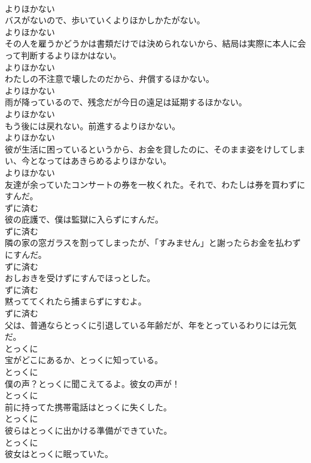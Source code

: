 \documentclass[8pt]{extreport}
\begin{document}
\begin{CJK}{UTF8}{min}
\\	よりほかない	
\\	バスがないので、歩いていくよりほかしかたがない。	
\\	よりほかない	
\\	その人を雇うかどうかは書類だけでは決められないから、結局は実際に本人に会って判断するよりほかはない。	
\\	よりほかない	
\\	わたしの不注意で壊したのだから、弁償するほかない。	
\\	よりほかない	
\\	雨が降っているので、残念だが今日の遠足は延期するほかない。	
\\	よりほかない	
\\	もう後には戻れない。前進するよりほかない。	
\\	よりほかない	
\\	彼が生活に困っているというから、お金を貸したのに、そのまま姿をけしてしまい、今となってはあきらめるよりほかない。	
\\	よりほかない	
\\	友達が余っていたコンサートの券を一枚くれた。それで、わたしは券を買わずにすんだ。	
\\	ずに済む	
\\	彼の庇護で、僕は監獄に入らずにすんだ。	
\\	ずに済む	
\\	隣の家の窓ガラスを割ってしまったが、「すみません」と謝ったらお金を払わずにすんだ。	
\\	ずに済む	
\\	おしおきを受けずにすんでほっとした。	
\\	ずに済む	
\\	黙っててくれたら捕まらずにすむよ。	
\\	ずに済む	
\\	父は、普通ならとっくに引退している年齢だが、年をとっているわりには元気だ。	
\\	とっくに	
\\	宝がどこにあるか、とっくに知っている。	
\\	とっくに	
\\	僕の声？とっくに聞こえてるよ。彼女の声が！	
\\	とっくに	
\\	前に持ってた携帯電話はとっくに失くした。	
\\	とっくに	
\\	彼らはとっくに出かける準備ができていた。	
\\	とっくに	
\\	彼女はとっくに眠っていた。	

\end{CJK}
\end{document}
